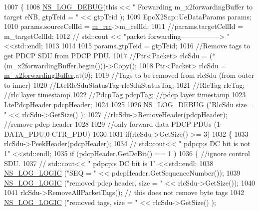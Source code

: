 \begin{DoxyCode}
1007   \{
1008     \hyperlink{group__logging_ga413f1886406d49f59a6a0a89b77b4d0a}{NS\_LOG\_DEBUG}(\textcolor{keyword}{this} << \textcolor{stringliteral}{" Forwarding m\_x2forwardingBuffer to target eNB, gtpTeid = "} << 
      gtpTeid );
1009     EpcX2Sap::UeDataParams params;
1010     params.sourceCellId = \hyperlink{classns3_1_1UeManager_ab4405e9f354c66e7c1a4c95832290f5b}{m\_rrc}->m\_cellId;
1011     \textcolor{comment}{//params.targetCellId = m\_targetCellId;}
1012    \textcolor{comment}{// std::cout << "packet forwarding-----------------> "<<std::endl;}
1013 
1014 
1015     params.gtpTeid = gtpTeid;
1016     \textcolor{comment}{//Remove tags to get PDCP SDU from PDCP PDU.}
1017     \textcolor{comment}{//Ptr<Packet> rlcSdu =  (*(m\_x2forwardingBuffer.begin()))->Copy();}
1018     Ptr<Packet> rlcSdu =  \hyperlink{classns3_1_1UeManager_a3fb8a9dc6ef434306f90f42837f3ae83}{m\_x2forwardingBuffer}.at(0);
1019     \textcolor{comment}{//Tags to be removed from rlcSdu (from outer to inner)}
1020     \textcolor{comment}{//LteRlcSduStatusTag rlcSduStatusTag;}
1021     \textcolor{comment}{//RlcTag  rlcTag; //rlc layer timestamp}
1022     \textcolor{comment}{//PdcpTag pdcpTag;  //pdcp layer timestamp}
1023     LtePdcpHeader pdcpHeader;
1024     
1025     
1026     \hyperlink{group__logging_ga413f1886406d49f59a6a0a89b77b4d0a}{NS\_LOG\_DEBUG} (\textcolor{stringliteral}{"RlcSdu size = "} << rlcSdu->GetSize() );
1027     \textcolor{comment}{//rlcSdu->RemoveHeader(pdcpHeader); //remove pdcp header}
1028     
1029     \textcolor{comment}{//only forward data PDCP PDUs (1-DATA\_PDU,0-CTR\_PDU)}
1030 
1031     \textcolor{keywordflow}{if}(rlcSdu->GetSize() >= 3)
1032     \{
1033       rlcSdu->PeekHeader(pdcpHeader);
1034     \textcolor{comment}{//  std::cout<< " pdpcp;s DC bit is not 1" <<std::endl;}
1035       \textcolor{keywordflow}{if} (pdcpHeader.GetDcBit() == 1 )
1036       \{ \textcolor{comment}{//ignore control SDU.}
1037         \textcolor{comment}{//  std::cout<< " pdpcp;s DC bit is  1" <<std::endl;}
1038           \hyperlink{group__logging_ga88acd260151caf2db9c0fc84997f45ce}{NS\_LOG\_LOGIC} (\textcolor{stringliteral}{"SEQ = "} << pdcpHeader.GetSequenceNumber());
1039         \hyperlink{group__logging_ga88acd260151caf2db9c0fc84997f45ce}{NS\_LOG\_LOGIC} (\textcolor{stringliteral}{"removed pdcp header, size = "} << rlcSdu->GetSize());
1040 
1041         rlcSdu->RemoveAllPacketTags(); \textcolor{comment}{// this does not remove byte tags}
1042         \hyperlink{group__logging_ga88acd260151caf2db9c0fc84997f45ce}{NS\_LOG\_LOGIC} (\textcolor{stringliteral}{"removed tags, size = "} << rlcSdu->GetSize() );

\end{DoxyCode}
